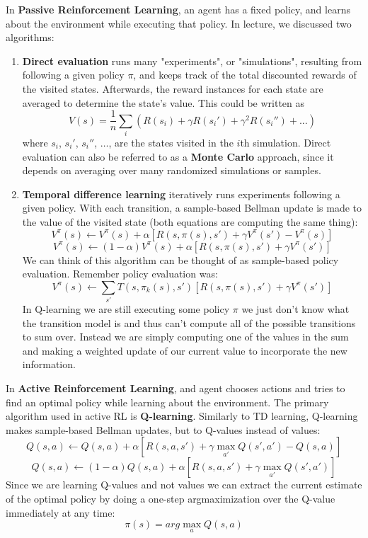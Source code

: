 \documentclass[a4paper]{article}
\begin{document}
\noindent In \textbf{Passive Reinforcement Learning}, an agent has a fixed policy, and learns about the environment while executing that policy. In lecture, we discussed two algorithms:
\begin{enumerate}
    \item \textbf{Direct evaluation} runs many "experiments", or "simulations", resulting from following a given policy $\pi$, and keeps track of the total discounted rewards of the visited states. Afterwards, the reward instances for each state are averaged to determine the state's value. This could be written as
    \[
    V(s) = \frac{1}{n} \sum_i (R(s_i) + \gamma R(s_i') + \gamma^2 R(s_i'') + ...)
    \]
    where $s_i$, $s_i'$, $s_i''$, $\dots$, are the states visited in the $i$th simulation. Direct evaluation can also be referred to as a \textbf{Monte Carlo} approach, since it depends on averaging over many randomized simulations or samples.
    \item \textbf{Temporal difference learning} iteratively runs experiments following a given policy. With each transition, a sample-based Bellman update is made to the value of the visited state (both equations are computing the same thing):
    \[
    V^{\pi}(s) \leftarrow V^{\pi}(s) + \alpha [R(s, \pi(s), s') + \gamma V^{\pi}(s') - V^{\pi}(s)]
    \]
    \[
    V^{\pi}(s) \leftarrow (1- \alpha) V^{\pi}(s) + \alpha [R(s, \pi(s), s') + \gamma V^{\pi}(s')]
    \]
    We can think of this algorithm can be thought of as sample-based policy evaluation. Remember policy evaluation was:
    $$V^{\pi}(s) \leftarrow \sum_{s'} T(s, \pi_k(s), s') [R(s,\pi(s),s') + \gamma V^{\pi}(s')]$$
    In Q-learning we are still executing some policy $\pi$ we just don't know what the transition model is and thus can't compute all of the possible transitions to sum over. Instead we are simply computing one of the values in the sum and making a weighted update of our current value to incorporate the new information.
\end{enumerate}

\noindent In \textbf{Active Reinforcement Learning}, and agent chooses actions and tries to find an optimal policy while learning about the environment. The primary algorithm used in active RL is \textbf{Q-learning}. Similarly to TD learning, Q-learning makes sample-based Bellman updates, but to Q-values instead of values:
\[
Q(s, a) \leftarrow Q(s, a) + \alpha [R(s, a, s') + \gamma \max_{a'} Q(s', a') - Q(s, a)]
\]
\[
Q(s, a) \leftarrow (1 - \alpha) Q(s, a) + \alpha [R(s, a, s') + \gamma \max_{a'} Q(s', a')]
\]
Since we are learning Q-values and not values we can extract the current estimate of the optimal policy by doing a one-step argmaximization over the Q-value immediately at any time: \\
\[
\pi(s) = arg\max_{a} Q(s,a)
\]
\end{document}
